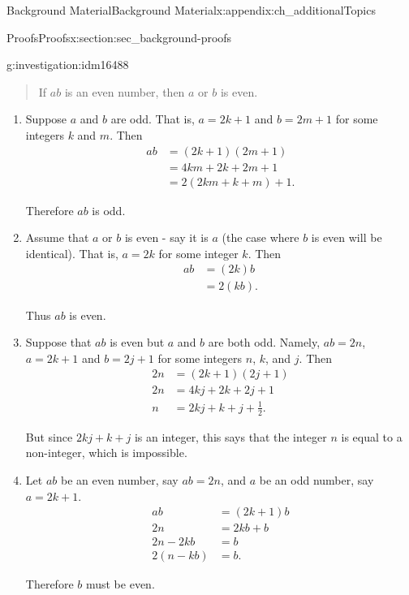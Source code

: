 \documentclass[oneside,10pt,]{book}
\numberwithin{equation}{chapter}
\newcommand{\amp}{&}
\begin{document}
\begin{appendixptx}{Background Material}{}{Background Material}{}{}{x:appendix:ch_additionalTopics}
\begin{sectionptx}{Proofs}{}{Proofs}{}{}{x:section:sec_background-proofs}
\begin{introduction}{}
\begin{investigation}{}{g:investigation:idm16488}
\begin{quote}%
If \(a b\) is an even number, then \(a\) or \(b\) is even.%
\end{quote}
%
\begin{enumerate}
\item{}Suppose \(a\) and \(b\) are odd. That is, \(a=2k+1\) and \(b=2m+1\) for some integers \(k\) and \(m\). Then%
\begin{align*}
ab \amp =(2k+1)(2m+1)\\
\amp =4km+2k+2m+1\\
\amp =2(2km+k+m)+1.
\end{align*}
%
\par
Therefore \(ab\) is odd.%
\item{}Assume that \(a\) or \(b\) is even - say it is \(a\) (the case where \(b\) is even will be identical). That is, \(a=2k\) for some integer \(k\). Then%
\begin{align*}
ab \amp =(2k)b\\
\amp =2(kb).
\end{align*}
%
\par
Thus \(ab\) is even.%
\item{}Suppose that \(ab\) is even but \(a\) and \(b\) are both odd. Namely, \(ab = 2n\), \(a=2k+1\) and \(b=2j+1\) for some integers \(n\), \(k\), and \(j\). Then%
\begin{align*}
2n \amp =(2k+1)(2j+1)\\
2n \amp =4kj+2k+2j+1\\
n \amp = 2kj+k+j+\frac{1}{2}.
\end{align*}
%
\par
But since \(2kj+k+j\) is an integer, this says that the integer \(n\) is equal to a non-integer, which is impossible.%
\item{}Let \(ab\) be an even number, say \(ab=2n\), and \(a\) be an odd number, say \(a=2k+1\).%
\begin{align*}
ab \amp =(2k+1)b\\
2n \amp =2kb+b\\
2n-2kb\amp =b\\
2(n-kb)\amp =b.
\end{align*}
%
\par
Therefore \(b\) must be even.%
\end{enumerate}
%
\end{investigation}

\end{introduction}
\end{sectionptx}
\end{appendixptx}
\end{document}
